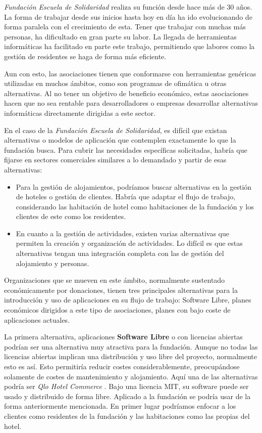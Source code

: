 \textit{Fundación Escuela de Solidaridad} realiza su función desde hace más de 30 años. La forma de trabajar desde sus inicios hasta hoy en día ha ido evolucionando de forma paralela con el crecimiento de esta. Tener que trabajar con muchas más personas, ha dificultado en gran parte su labor. La llegada de herramientas informáticas ha facilitado en parte este trabajo, permitiendo que labores como la gestión de residentes se haga de forma más eficiente. 

Aun con esto, las asociaciones tienen que conformarse con herramientas genéricas utilizadas en muchos ámbitos, como son programas de ofimática u otras alternativas. Al no tener un objetivo de beneficio económico, estas asociaciones hacen que no sea rentable para desarrolladores o empresas desarrollar alternativas informáticas directamente dirigidas a este sector. 

En el caso de la \textit{Fundación Escuela de Solidaridad}, es difícil que existan alternativas o modelos de aplicación que contemplen exactamente lo que la fundación busca. Para cubrir las necesidades específicas solicitadas, habría que fijarse en sectores comerciales similares a lo demandado y partir de esas alternativas:

\begin{itemize}
    \item Para la gestión de alojamientos, podríamos buscar alternativas en la gestión de hoteles o gestión de clientes. Habría que adaptar el flujo de trabajo, considerando las habitación de hotel como habitaciones de la fundación y los clientes de este como los residentes.
    \item En cuanto a la gestión de actividades, existen varias alternativas que permiten la creación y organización de actividades. Lo difícil es que estas alternativas tengan una integración completa con las de gestión del alojamiento y personas.
\end{itemize}

Organizaciones que se mueven en este ámbito, normalmente sustentado económicamente por donaciones, tienen tres principales alternativas para la introducción y uso de aplicaciones en su flujo de trabajo: Software Libre, planes económicos dirigidos a este tipo de asociaciones, planes con bajo coste de aplicaciones actuales. 

La primera alternativa, aplicaciones \textbf{Software Libre} o con licencias abiertas podrían ser una alternativa muy atractiva para la fundación. Aunque no todas las licencias abiertas implican una distribución y uso libre del proyecto, normalmente esto es así. Esto permitiría reducir costes considerablemente, preocupándose solamente de costes de mantenimiento y alojamiento. Aquí una de las alternativas podría ser \textit{Qlo Hotel Commerce} \cite{qloapps}. Bajo una licencia MIT, su software puede ser usado y distribuido de forma libre. Aplicado a la fundación se podría usar de la forma anteriormente mencionada. En primer lugar podríamos enfocar a los clientes como residentes de la fundación y las habitaciones como las propias del hotel. 

